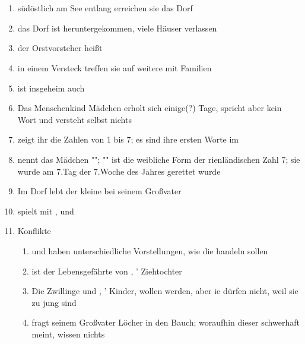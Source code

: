 \documentclass[12pt,a4paper,onecolumn,oneside,ngerman]{book}
\begin{document}
\chapter[Im Nest]{}
\begin{enumerate}
  \item südöstlich am {\Tern}See entlang erreichen sie das Dorf {\Beron}
  \item das Dorf ist heruntergekommen, viele Häuser verlassen
  \item der Orstvorsteher heißt {\Nox}
  \item in einem Versteck treffen sie auf weitere {\Schattenlaufer} mit Familien
  \item {\Nox} ist insgeheim auch {\Schattenlaufer}
  \item Das Menschenkind Mädchen erholt sich einige(?) Tage, spricht aber kein Wort und versteht selbst nichts
  \item {\Nox} zeigt ihr die Zahlen von 1 bis 7; es sind ihre ersten Worte im {\Enland}
  \item {\Nox} nennt das Mädchen "{\Sena}"; "{\Sena}"{ }ist die weibliche Form der rienländischen Zahl 7; sie wurde am 7.Tag der 7.Woche des Jahres gerettet wurde
  \item Im Dorf {\Beron} lebt der kleine {\Molitor} bei seinem Großvater
  \item {\Molitor} spielt mit {\Enna}, {\Enno} und {\Sena}
  \item Konflikte
  \begin{enumerate}
    \item {\Nox} und {\Eno} haben unterschiedliche Vorstellungen, wie die {\Schattenlaufer} handeln sollen
    \item {\Nox} ist der Lebensgefährte von {\Mena}, {\Nox}' Ziehtochter
    \item Die Zwillinge {\Enna} und {\Enno}, {\Nox}' Kinder, wollen {\Schattenlaufer} werden, aber ie dürfen nicht, weil sie zu jung sind
    \item {\Molitor} fragt seinem Großvater Löcher in den Bauch; woraufhin dieser schwerhaft meint, {\Molitor} wissen nichts
  \end{enumerate}
\end{enumerate}
\end{document}
